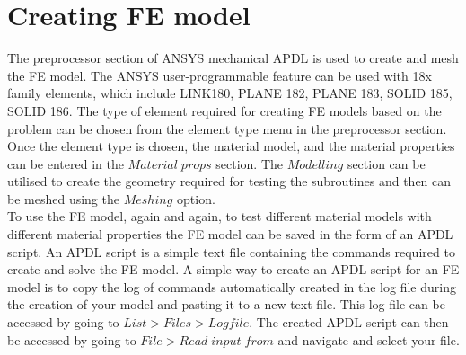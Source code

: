 \documentclass[12pt]{report}
\begin{document}
\section{Creating FE model}
\indent\indent\indent  The preprocessor section of ANSYS mechanical APDL is used to create and mesh the FE model. The ANSYS user-programmable feature can be used with 18x family elements, which include LINK180, PLANE 182, PLANE 183, SOLID 185, SOLID 186. The type of element required for creating FE models based on the problem can be chosen from the element type menu in the preprocessor section. Once the element type is chosen, the material model, and the material properties can be entered in the $Material\; props$ section.  The $Modelling$ section can be utilised to create the geometry required for testing the subroutines and then can be meshed using the $Meshing$ option.\\ \indent\indent\indent To use the FE model, again and again, to test different material models with different material properties the FE model can be saved in the form of an APDL script.  An APDL script is a simple text file containing the commands required to create and solve the FE model. A simple way to create an APDL script for an FE model is to copy the log of commands automatically created in the log file during the creation of your model and pasting it to a new text file. This log file can be accessed by going to $List>Files>Logfile$. The created APDL script can then be accessed by going to $File>Read \;input\; from$ and navigate and select your file.
\end{document}
